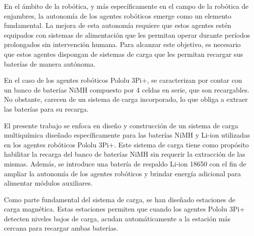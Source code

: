 
En el ámbito de la robótica, y más específicamente en el campo de
 la robótica de enjambres, la autonomía de los agentes robóticos emerge como
un elemento fundamental. La mejora de esta autonomía requiere que estos agentes
estén equipados con sistemas de alimentación que les permitan operar durante 
períodos prolongados sin intervención humana. Para alcanzar este objetivo, es 
necesario que estos agentes dispongan de sistemas de carga que les permitan 
recargar sus baterías de manera autónoma.

En el caso de los agentes robóticos Pololu 3Pi+, se caracterizan por contar
con un banco de baterías NiMH compuesto por 4 celdas en serie, que son 
recargables. No obstante, carecen de un sistema de carga incorporado, lo 
que obliga a extraer las baterías para su recarga.

El presente trabajo se enfoca en diseño y construcción de un sistema 
de carga multiquímica diseñado específicamente para las baterías NiMH y 
Li-ion utilizadas en los agentes robóticos Pololu 3Pi+. Este sistema de carga 
tiene como propósito habilitar la recarga del banco de baterías NiMH sin 
requerir la extracción de las mismas. Además, se introduce una batería de 
respaldo Li-ion 18650 con el fin de ampliar la autonomía de los agentes 
robóticos y brindar energía adicional para alimentar módulos auxiliares.

Como parte fundamental del sistema de carga, se han diseñado estaciones de
 carga magnética. Estas estaciones permiten que cuando los agentes Pololu 
 3Pi+ detecten niveles bajos de carga, acudan automáticamente a la estación
más cercana para recargar ambas baterías.
